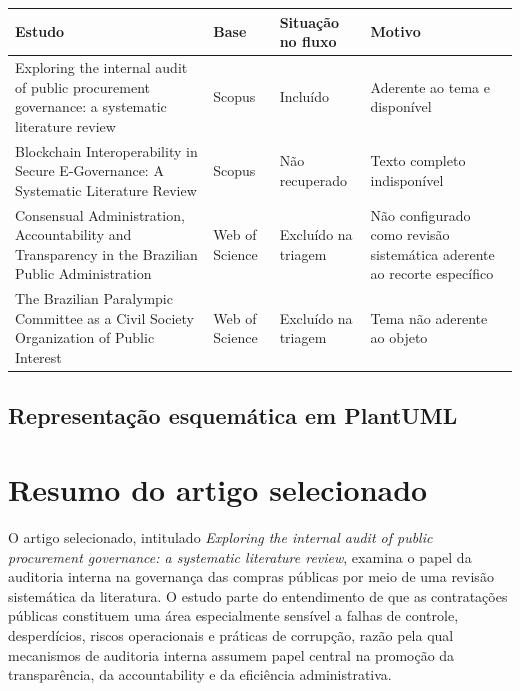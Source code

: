 \documentclass[12pt]{article}
\begin{document}
\begin{table}[htbp]
\centering
\scriptsize
\setlength{\tabcolsep}{3pt}
\renewcommand{\arraystretch}{1.15}
\begin{tabularx}{\textwidth}{>{\raggedright\arraybackslash}X >{\raggedright\arraybackslash}m{} >{\raggedright\arraybackslash}m{} >{\raggedright\arraybackslash}m{}}
\toprule
Estudo & Base & Situação no fluxo & Motivo \\
\midrule
Exploring the internal audit of public procurement governance: a systematic literature review & Scopus & Incluído & Aderente ao tema e disponível \\
Blockchain Interoperability in Secure E-Governance: A Systematic Literature Review & Scopus & Não recuperado & Texto completo indisponível \\
Consensual Administration, Accountability and Transparency in the Brazilian Public Administration & Web of Science & Excluído na triagem & Não configurado como revisão sistemática aderente ao recorte específico \\
The Brazilian Paralympic Committee as a Civil Society Organization of Public Interest & Web of Science & Excluído na triagem & Tema não aderente ao objeto \\
\bottomrule
\end{tabularx}
\normalsize
\end{table}

\subsection{Representação esquemática em PlantUML}
\label{sec:org10b8ba6}

\begin{center}

\end{center}

\section{Resumo do artigo selecionado}
\label{sec:org52283ac}

O artigo selecionado, intitulado \emph{Exploring the internal audit of public procurement governance: a systematic literature review}, examina o papel da auditoria interna na governança das compras públicas por meio de uma revisão sistemática da literatura. O estudo parte do entendimento de que as contratações públicas constituem uma área especialmente sensível a falhas de controle, desperdícios, riscos operacionais e práticas de corrupção, razão pela qual mecanismos de auditoria interna assumem papel central na promoção da transparência, da accountability e da eficiência administrativa.
\end{document}
